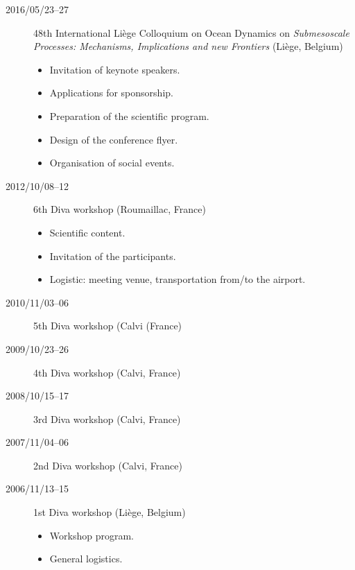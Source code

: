 \documentclass[11pt,a4paper,svgnames]{article}
\begin{document}
\begin{description}
\item[2016/05/23--27] 48th International Li\`{e}ge Colloquium on Ocean Dynamics on \textit{Submesoscale Processes: Mechanisms, Implications and new Frontiers} (Li\`{e}ge, Belgium)
\begin{itemize}
\item Invitation of keynote speakers.
\item Applications for sponsorship.
\item Preparation of the scientific program.
\item Design of the conference flyer.
\item Organisation of social events.
\end{itemize}

\item[2012/10/08--12] 6th Diva workshop (Roumaillac, France)
\begin{itemize}
\item Scientific content.
\item Invitation of the participants.
\item Logistic: meeting venue, transportation from/to the airport.
\end{itemize}

\item[2010/11/03--06] 5th Diva workshop (Calvi (France)
\item[2009/10/23--26] 4th Diva workshop (Calvi, France)
\item[2008/10/15--17] 3rd Diva workshop (Calvi, France)
\item[2007/11/04--06] 2nd Diva workshop (Calvi, France)
\item[2006/11/13--15] 1st Diva workshop (Li\`{e}ge, Belgium)
\begin{itemize}
\item Workshop program.
\item General logistics. 
\end{itemize}
\end{description}
\end{document}
